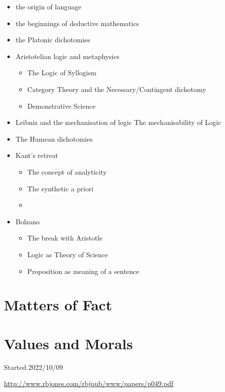 \documentclass[10pt,titlepage]{article}
\begin{document}
\begin{itemize}
\item the origin of language
\item the beginnings of deductive mathematics
\item the Platonic dichotomies
\item Aristotelian logic and metaphysics
  \begin{itemize}
\item  The Logic of Syllogism
\item  Category Theory and the Necessary/Contingent dichotomy
\item  Demonstrative Science
  \end{itemize}
\item Leibniz and the mechanisation of logic
  The mechanisability of Logic
\item The Humean dichotomies
\item Kant's retreat
  \begin{itemize}
\item   The concept of analyticity
\item   The synthetic a priori
\item   \end{itemize}
\item Bolzano
  \begin{itemize}
\item   The break with Aristotle
\item   Logic as Theory of Science
\item   Proposition as meaning of a sentence
  \end{itemize}

\end{itemize}

\section{Matters of Fact}


\section{Values and Morals}


{}





\tiny{
Started 2022/10/09

\href{http://www.rbjones.com/rbjpub/www/papers/p049.pdf}{http://www.rbjones.com/rbjpub/www/papers/p049.pdf}

}%
\end{document}
